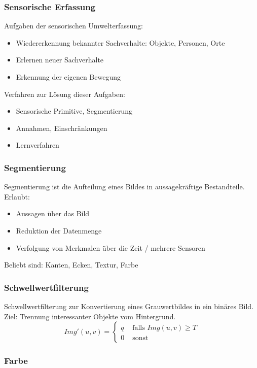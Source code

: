 \subsubsection*{Sensorische Erfassung}

Aufgaben der sensorischen Umwelterfassung:
\begin{itemize}
\item Wiedererkennung bekannter Sachverhalte: Objekte, Personen, Orte
\item Erlernen neuer Sachverhalte
\item Erkennung der eigenen Bewegung
\end{itemize}
Verfahren zur Lösung dieser Aufgaben:
\begin{itemize}
\item Sensorische Primitive, Segmentierung
\item Annahmen, Einschränkungen
\item Lernverfahren
\end{itemize}

\subsubsection*{Segmentierung}

Segmentierung ist die Aufteilung eines Bildes in aussagekräftige Bestandteile. Erlaubt:
\begin{itemize}
\item Aussagen über das Bild
\item Reduktion der Datenmenge
\item Verfolgung von Merkmalen über die Zeit / mehrere Sensoren
\end{itemize}
Beliebt sind: Kanten, Ecken, Textur, Farbe

\subsubsection*{Schwellwertfilterung}

Schwellwertfilterung zur Konvertierung eines Grauwertbildes in ein binäres Bild. Ziel: Trennung interessanter Objekte vom Hintergrund. $$Img'(u,v) = \left\{ \begin{array}{cl} q & \textrm{ falls } Img(u,v) \geq T \\ 0 & \textrm{ sonst} \end{array} \right.$$

\subsubsection*{Farbe}

